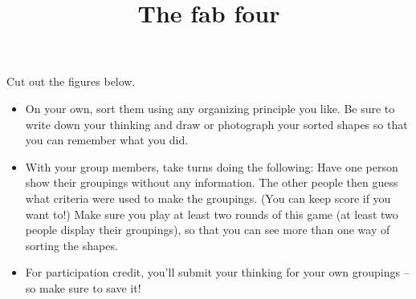 \documentclass[nooutcomes,noauthor]{ximera}
\title{The fab four}
\begin{document}
\begin{abstract}\end{abstract}
\maketitle




\begin{problem}
Cut out the figures below. 
\begin{itemize}
    \item  On your own, sort them using any organizing principle you like.  Be sure to write down your thinking and draw or photograph your sorted shapes so that you can remember what you did.
    \item With your group members, take turns doing the following: Have one person show their groupings without any information. The other people then guess what criteria were used to make the groupings. (You can keep score if you want to!) Make sure you play at least two rounds of this game (at least two people display their groupings), so that you can see more than one way of sorting the shapes. 
    \item For participation credit, you'll submit your thinking for your own groupings -- so make sure to save it! 
    
\end{itemize}

\begin{center}
\end{center}
\end{problem}
\end{document}
